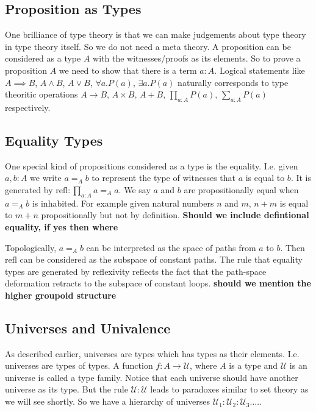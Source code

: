 \documentclass[10pt]{article}
\theoremstyle{definition}
\theoremstyle{plain}
\theoremstyle{remark}
\newcommand{\U}{\mathscr{U}}
\begin{document}
\subsection{Proposition as Types}
One brilliance of type theory is that we can make judgements about type theory in type theory
itself. So we do not need a meta theory. A proposition can be considered as a type $A$ with 
the witnesses/proofs as its elements. So to prove a proposition $A$ we need to show that 
there is a term $a : A$. Logical statements like $A \implies B$, $A \wedge B$, $A \vee B$, 
$\forall a. P(a)$, $\exists a. P(a)$ naturally corresponds to type theoritic operations 
$A \to B$, $A \times B$, $A + B$, $\prod_{a : A} P(a)$, $\sum_{a : A} P(a)$
respectively.\smallskip

\subsection{Equality Types}
One special kind of propositions considered as a type is the equality. I.e. given $a,b : A$ we
write $a =_A b$ to represent the type of witnesses that $a$ is equal to $b$. It is
generated by $\text{refl} :\prod_{a : A} a =_A a$. We say $a$ and
$b$ are propositionally equal when $a =_A b$ is inhabited. For example given natural
numbers $n$ and $m$, $n+m$ is equal to $m+n$ propositionally but not by definition.
\textbf{Should we include defintional equality, if yes then where}
\smallskip

Topologically, $a =_A b$ can be interpreted as the space of paths from $a$ to $b$. Then 
$\text{refl}$ can be considered as the subspace of constant paths. The rule that equality
types are generated by reflexivity reflects the fact that the path-space deformation retracts
to the subspace of constant loops. \textbf{should we mention the higher groupoid structure	}

\subsection{Universes and Univalence}

As described earlier, universes are types which has types as their elements. I.e. universes
are types of types. A function $f : A \to \U$, where $A$ is a type and $\U$ is an universe
is called a type family. Notice that each universe should have another universe as its type.
But the rule $\U : \U$ leads to paradoxes similar to set theory as we will see shortly. 
So we have a hierarchy of universes $\U_1 : \U_2 : \U_3 \dots $.\smallskip.
\end{document}

